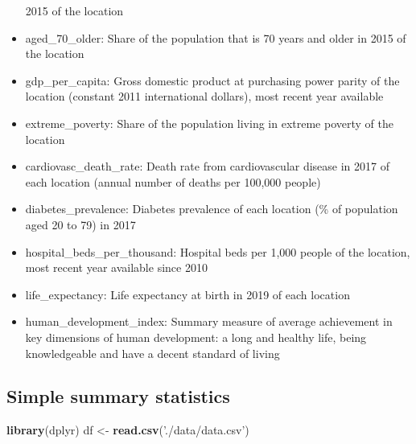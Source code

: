 \documentclass[]{article}
\newenvironment{Shaded}{\begin{snugshade}}{\end{snugshade}}
\newcommand{\DataTypeTok}[1]{\textcolor[rgb]{0.13,0.29,0.53}{#1}}
\newcommand{\KeywordTok}[1]{\textcolor[rgb]{0.13,0.29,0.53}{\textbf{#1}}}
\newcommand{\NormalTok}[1]{#1}
\newcommand{\OperatorTok}[1]{\textcolor[rgb]{0.81,0.36,0.00}{\textbf{#1}}}
\newcommand{\OtherTok}[1]{\textcolor[rgb]{0.56,0.35,0.01}{#1}}
\newcommand{\StringTok}[1]{\textcolor[rgb]{0.31,0.60,0.02}{#1}}
\begin{document}
\begin{itemize}
  2015 of the location
\item
  aged\_70\_older: Share of the population that is 70 years and older in
  2015 of the location
\item
  gdp\_per\_capita: Gross domestic product at purchasing power parity of
  the location (constant 2011 international dollars), most recent year
  available\\
\item
  extreme\_poverty: Share of the population living in extreme poverty of
  the location
\item
  cardiovasc\_death\_rate: Death rate from cardiovascular disease in
  2017 of each location (annual number of deaths per 100,000 people)\\
\item
  diabetes\_prevalence: Diabetes prevalence of each location (\% of
  population aged 20 to 79) in 2017
\item
  hospital\_beds\_per\_thousand: Hospital beds per 1,000 people of the
  location, most recent year available since 2010
\item
  life\_expectancy: Life expectancy at birth in 2019 of each location
\item
  human\_development\_index: Summary measure of average achievement in
  key dimensions of human development: a long and healthy life, being
  knowledgeable and have a decent standard of living
\end{itemize}

\hypertarget{simple-summary-statistics}{%
\subsection{Simple summary statistics}\label{simple-summary-statistics}}

\begin{Shaded}
\begin{Highlighting}[]
\KeywordTok{library}\NormalTok{(dplyr)}
\NormalTok{df <-}\StringTok{ }\KeywordTok{read.csv}\NormalTok{(}\StringTok{'./data/data.csv'}\NormalTok{)}
\end{Highlighting}
\end{Shaded}

\begin{Shaded}
\end{Shaded}
\end{document}
